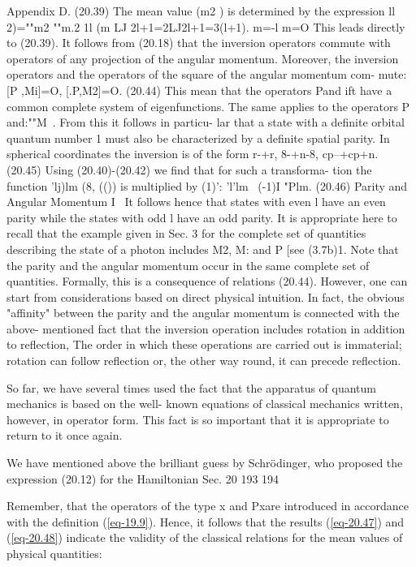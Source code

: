 \documentclass[a4paper,sfsidenotes,colorlinks=true]{tufte-book}
\numberwithin{equation}{section}
\numberwithin{figure}{section}
\begin{document}
{{    Appendix D.  (20.39) The mean value (m2 ) is determined by the
    expression ll 2)=""m2 ""m.2 1l (m LJ 2l+1=2LJ2l+1=3(l+1).  m=-l
    m=O This leads directly to (20.39).  It follows from (20.18) that
    the inversion operators commute with operators of any projection
    of the angular momentum. Moreover, the inversion operators and the
    operators of the square of the angular momentum com- mute: [P
    ,Mi]=O, [.P,M2]=O. (20.44) This mean that the operators Pand ift
    have a common complete system of eigenfunctions. The same applies
    to the operators P and:""M~. From this it follows in particu- lar
    that a state with a definite orbital quantum number 1 must also be
    characterized by a definite spatial parity. In spherical
    coordinates the inversion is of the form r-+r, 8-+n-8,
    cp--+cp+n. (20.45) Using (20.40)-(20.42) we find that for such a
    transforma- tion the function 'lj)lm (8, (()) is multiplied by
    (1)': 'l'lm~ (-1)I "Plm. (20.46) Parity and Angular Momentum I~ It
    follows hence that states with even l have an even parity while
    the states with odd l have an odd parity. It is appropriate here
    to recall that the example given in Sec. 3 for the complete set of
    quantities describing the state of a photon includes M2, M: and P
    [see (3.7b)1. Note that the parity and the angular momentum occur
    in the same complete set of quantities. Formally, this is a
    consequence of relations (20.44). However, one can start from
    considerations based on direct physical intuition. In fact, the
    obvious "affinity" between the parity and the angular momentum is
    connected with the above- mentioned fact that the inversion
    operation includes rotation in addition to reflection, The order
    in which these operations are carried out is immaterial; rotation
    can follow reflection or, the other way round, it can precede
    reflection. 

So  far, we have several times used the fact that the
    apparatus of quantum mechanics is based on the well- known
    equations of classical mechanics written, however, in operator
    form. This fact is so important that it is appropriate to return
    to it once again.  

We have mentioned above the brilliant guess by
    Schr\"odinger, who proposed the expression (20.12) for the
    Hamiltonian Sec. 20  193 194 

Remember, that the operators of the type x and Pxare
    introduced in accordance with the definition (\ref{eq-19.9}). Hence, it
    follows that the results (\ref{eq-20.47}) and (\ref{eq-20.48}) indicate the validity
    of the classical relations for the mean values of physical
    quantities: 

}}
\end{document}
